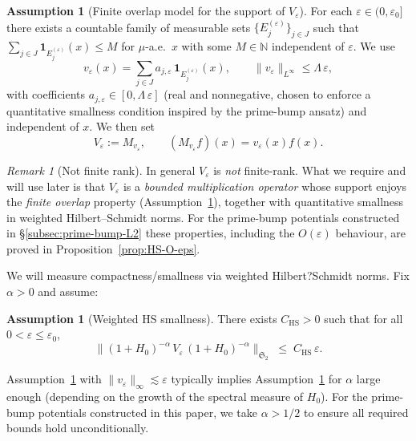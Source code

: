 ﻿\documentclass[12pt,a4paper]{article}
\theoremstyle{definition}
\newtheorem{assumption}[theorem]{Assumption}
\theoremstyle{remark}
\newtheorem{remark}[theorem]{Remark}
\begin{document}
\begin{assumption}[Finite overlap model for the support of $V_\varepsilon$]
\label{ass:finite-overlap}
For each $\varepsilon\in(0,\varepsilon_0]$ there exists a countable family of
measurable sets $\{E_j^{(\varepsilon)}\}_{j\in J}$ such that
$\sum_{j\in J}\mathbf{1}_{E_j^{(\varepsilon)}}(x)\le M$ for $\mu$-a.e.\ $x$
with some $M\in\mathbb{N}$ independent of $\varepsilon$. We use
\[
  v_\varepsilon(x)=\sum_{j\in J} a_{j,\varepsilon}\,\mathbf{1}_{E_j^{(\varepsilon)}}(x),
  \qquad \|v_\varepsilon\|_{L^\infty}\le \Lambda\,\varepsilon,
\]
with coefficients $a_{j,\varepsilon}\in[0,\Lambda\,\varepsilon]$ (real and nonnegative, chosen to enforce a quantitative smallness condition inspired by the prime-bump ansatz) and independent of $x$. We then set
\[
  V_\varepsilon := M_{v_\varepsilon},\qquad (M_{v_\varepsilon}f)(x)=v_\varepsilon(x)f(x).
\]
\end{assumption}

\begin{remark}[Not finite rank]
\label{rem:not-finite-rank}
In general $V_\varepsilon$ is \emph{not} finite-rank. What we require and will
use later is that $V_\varepsilon$ is a \emph{bounded multiplication operator}
whose support enjoys the \emph{finite overlap} property
(Assumption~\ref{ass:finite-overlap}), together with quantitative smallness in weighted Hilbert--Schmidt norms. For the prime-bump potentials constructed in \S\ref{subsec:prime-bump-L2} these properties, including the $O(\varepsilon)$ behaviour, are proved in Proposition~\ref{prop:HS-O-eps}.
\end{remark}

We will measure compactness/smallness via weighted Hilbert?Schmidt norms. Fix
$\alpha>0$ and assume:
\begin{assumption}[Weighted HS smallness]
\label{ass:weighted-HS}
There exists $C_{\mathrm{HS}}>0$ such that for all $0<\varepsilon\le\varepsilon_0$,
\[
  \big\|(1+H_0)^{-\alpha}\,V_\varepsilon\,(1+H_0)^{-\alpha}\big\|_{\mathfrak{S}_2}
  \;\le\; C_{\mathrm{HS}}\,\varepsilon.
\]
\end{assumption}

Assumption~\ref{ass:finite-overlap} with $\|v_\varepsilon\|_\infty\lesssim\varepsilon$
typically implies Assumption~\ref{ass:weighted-HS} for $\alpha$ large enough
(depending on the growth of the spectral measure of $H_0$). For the prime-bump potentials constructed in this paper, we take $\alpha > 1/2$ to ensure all required bounds hold unconditionally.
\end{document}
